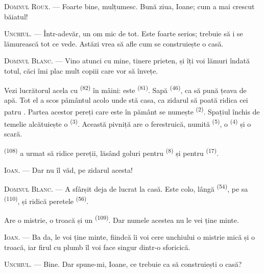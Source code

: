 \textsc{Domnul Roux}. --- Foarte bine, mulțumesc. Bună ziua, Ioane; cum a mai
crescut băiatul!

\textsc{Unchiul}. --- Într-adevăr, un om mic de tot. Este foarte serios; trebuie
să i se lămurească tot ce vede. Astăzi vrea să afle cum se construiește o casă.

\VUsaut{3.0mm}

\textsc{Domnul Blanc}. --- Vino atunci cu mine, tinere prieten, și îți voi lămuri
îndată totul, căci îmi plac mult copiii care vor să învețe.

Vezi lucrătorul acela cu  \textsuperscript{(82)} în mâini: este
 \textsuperscript{(81)}. Sapă 
\textsuperscript{(46)}, ca să pună țeava de apă. Tot el a scos pământul acolo unde
stă casa, ca zidarul să poată ridica cei patru . Partea acestor
pereți care este în pământ se numește  \textsuperscript{(2)}.
Spațiul închis de temelie alcătuiește o  \textsuperscript{(3)}.
Această pivniță are o ferestruică, numită 
\textsuperscript{(5)}, o  \textsuperscript{(4)} și o scară.

 \textsuperscript{(108)} a urmat să ridice pereții, lăsând goluri
pentru  \textsuperscript{(8)} și pentru 
\textsuperscript{(17)}.

\textsc{Ioan}. --- Dar nu îl văd, pe zidarul acesta!

\textsc{Domnul Blanc}. --- A sfârșit deja de lucrat la casă. Este colo, lângă
 \textsuperscript{(54)}, pe  sa
\textsuperscript{(110)}, și ridică peretele 
\textsuperscript{(56)}.

Are o mistrie, o troacă și un  \textsuperscript{(109)}. Dar
numele acestea nu le vei ține minte.

\textsc{Ioan}. --- Ba da, le voi ține minte, fiindcă îi voi cere unchiului o
mistrie mică și o troacă, iar firul cu plumb îl voi face singur dintr-o sforicică.

\VUsaut{3.0mm}
\VUsaut{3.0mm}

\textsc{Unchiul}. --- Bine. Dar spune-mi, Ioane, ce trebuie ca să construiești o
casă?

